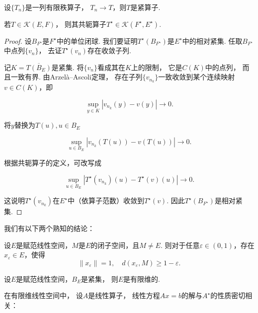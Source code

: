     \begin{corollary}
        设$\{T_n\}$是一列有限秩算子，
        $T_n \to T$，则$T$是紧算子.
    \end{corollary}

    \begin{theorem}[Schauder]
        若$T \in \mathcal{K}(E,F)$，
        则其共轭算子$T^\star \in \mathcal{K}(F^\star,E^\star)$.
    \end{theorem}

    \begin{proof}
            设$B_{F^\star}$是$F^\star$中的单位闭球.
    我们要证明$T^\star(B_{F^\star})$是$E^\star$中的相对紧集.
    任取$B_{F^\star}$中点列$\{v_n\}$，
    去证$T^\star(v_n)$存在收敛子列.

    记$K = \overline{T(B_E)}$是紧集.
    将$\{v_n\}$看成其在$K$上的限制，
    它是$C(K)$中的点列，
    而且一致有界.
    由Arzelà–Ascoli定理，
    存在子列$\{v_{n_k}\}$一致收敛到某个连续映射$v \in C(K)$，即

    \[
        \sup_{y \in K} |v_{n_k}(y) - v(y)| \to 0.
    \]

    将$y$替换为$T(u), u \in B_E$

    \[
        \sup_{u \in B_E} |v_{n_k}(T(u)) - v(T(u))| \to 0.
    \]

    根据共轭算子的定义，可改写成

    \[
        \sup_{u \in B_E} |T^\star(v_{n_k})(u) - T^\star(v)(u)| \to 0.
    \]

    这说明$T^\star(v_{n_k})$在$E^\star$中（依算子范数）收敛到$T^\star(v)$.
    因此$T^\star(B_{F^\star})$是相对紧集.   
    \end{proof}



我们有以下两个熟知的结论：

\begin{lemma}[Riesz引理]
    设$E$是赋范线性空间，$M$是$E$的闭子空间，且$M \neq E$.
    则对于任意$\varepsilon \in (0,1)$，存在$x_\varepsilon \in E$，使得
    \[
        \|x_\varepsilon\| = 1,
        \quad
        d(x_\varepsilon,M) \ge 1 - \varepsilon.
    \]
\end{lemma}

\begin{theorem}[Riesz]
    设$E$是赋范线性空间，$B_E$是紧集，
    则$E$是有限维的.
\end{theorem}

在有限维线性空间中，
设$A$是线性算子，
线性方程$Ax = b$的解与$A^\star$的性质密切相关：


